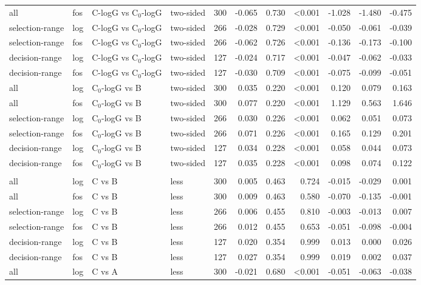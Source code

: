 \begin{longtable}{llllrrrrrrr}
all & fos & C-logG vs C$_0$-logG & two-sided & 300 & -0.065 & 0.730 & <0.001 & -1.028 & -1.480 & -0.475 \\
selection-range & log & C-logG vs C$_0$-logG & two-sided & 266 & -0.028 & 0.729 & <0.001 & -0.050 & -0.061 & -0.039 \\
selection-range & fos & C-logG vs C$_0$-logG & two-sided & 266 & -0.062 & 0.726 & <0.001 & -0.136 & -0.173 & -0.100 \\
decision-range & log & C-logG vs C$_0$-logG & two-sided & 127 & -0.024 & 0.717 & <0.001 & -0.047 & -0.062 & -0.033 \\
decision-range & fos & C-logG vs C$_0$-logG & two-sided & 127 & -0.030 & 0.709 & <0.001 & -0.075 & -0.099 & -0.051 \\
all & log & C$_0$-logG vs B & two-sided & 300 & 0.035 & 0.220 & <0.001 & 0.120 & 0.079 & 0.163 \\
all & fos & C$_0$-logG vs B & two-sided & 300 & 0.077 & 0.220 & <0.001 & 1.129 & 0.563 & 1.646 \\
selection-range & log & C$_0$-logG vs B & two-sided & 266 & 0.030 & 0.226 & <0.001 & 0.062 & 0.051 & 0.073 \\
selection-range & fos & C$_0$-logG vs B & two-sided & 266 & 0.071 & 0.226 & <0.001 & 0.165 & 0.129 & 0.201 \\
decision-range & log & C$_0$-logG vs B & two-sided & 127 & 0.034 & 0.228 & <0.001 & 0.058 & 0.044 & 0.073 \\
decision-range & fos & C$_0$-logG vs B & two-sided & 127 & 0.035 & 0.228 & <0.001 & 0.098 & 0.074 & 0.122 \\
\addlinespace
\multicolumn{11}{l}{\textit{RF}} \\
all & log & C vs B & less & 300 & 0.005 & 0.463 & 0.724 & -0.015 & -0.029 & 0.001 \\
all & fos & C vs B & less & 300 & 0.009 & 0.463 & 0.580 & -0.070 & -0.135 & -0.001 \\
selection-range & log & C vs B & less & 266 & 0.006 & 0.455 & 0.810 & -0.003 & -0.013 & 0.007 \\
selection-range & fos & C vs B & less & 266 & 0.012 & 0.455 & 0.653 & -0.051 & -0.098 & -0.004 \\
decision-range & log & C vs B & less & 127 & 0.020 & 0.354 & 0.999 & 0.013 & 0.000 & 0.026 \\
decision-range & fos & C vs B & less & 127 & 0.027 & 0.354 & 0.999 & 0.019 & 0.002 & 0.037 \\
all & log & C vs A & less & 300 & -0.021 & 0.680 & <0.001 & -0.051 & -0.063 & -0.038 \\

\end{longtable}

